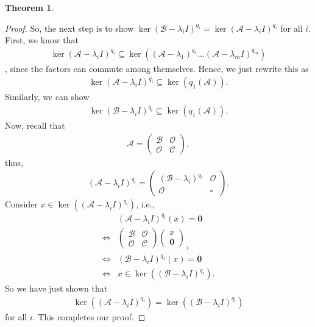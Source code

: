 \documentclass{article}
\theoremstyle{definition}
\newtheorem{thm}{Theorem}[section]
\newcommand{\A}{\mathcal{A}}
\begin{document}
\begin{thm}
\begin{proof}
		So, the next step is to show $\ker(\mathcal{B} - \lambda_i I)^{q_i} = \ker(\A - \lambda_i I)^{q_i}$ for all $i$. First, we know that
		\begin{align*}
		\ker(\A - \lambda_i I)^{q_i} \subseteq \ker\left( (\A - \lambda_1)^{q_1}\dots (\A - \lambda_m I)^{q_m} \right)
		\end{align*},
		since the factors can commute among themselves. Hence, we just rewrite this as
		\begin{align*}
		\ker(\A - \lambda_i I)^{q_i} \subseteq \ker(q_1(\A)).
		\end{align*}
		Similarly, we can show 
		\begin{align*}
		\ker(\mathcal{B} - \lambda_i I)^{q_i} \subseteq \ker(q_1(\A)).
		\end{align*}
		Now, recall that 
		\begin{align*}
		\A = \begin{pmatrix}
		\mathcal{B} & \mathcal{O}\\
		\mathcal{O} & \mathcal{C}
		\end{pmatrix},
		\end{align*}
		thus,
		\begin{align*}
		(\A - \lambda_i I)^{q_i} = \begin{pmatrix}
		(\mathcal{B} - \lambda_i)^{q_i} & \mathcal{O}\\
		\mathcal{O} & \square
		\end{pmatrix}.
		\end{align*}
		Consider $x \in \ker\left((\A - \lambda_i I)^{q_i}\right)$, i.e., 
		\begin{align*}
		&(\A - \lambda_i I)^{q_i}(x) = \mathbf{0}\\
		\iff &\begin{pmatrix}
		\mathcal{B} & \mathcal{O}\\
		\mathcal{O} & \mathcal{C}
		\end{pmatrix}\begin{pmatrix}
		x\\\mathbf{0}
		\end{pmatrix}_+\\
		\iff &(\mathcal{B} - \lambda_i I)^{q_i}(x) = \mathbf{0}\\
		\iff &x \in \ker\left( (\mathcal{B} - \lambda_i I)^{q_i} \right).
		\end{align*}
		So we have just shown that 
		\begin{align*}
		\ker\left( (\A - \lambda_i I)^{q_i} \right) = \ker\left( (\mathcal{B} - \lambda_i I)^{q_i}\right)
		\end{align*}
		for all $i$. This completes our proof. 
	\end{proof}
\end{thm}
\end{document}
